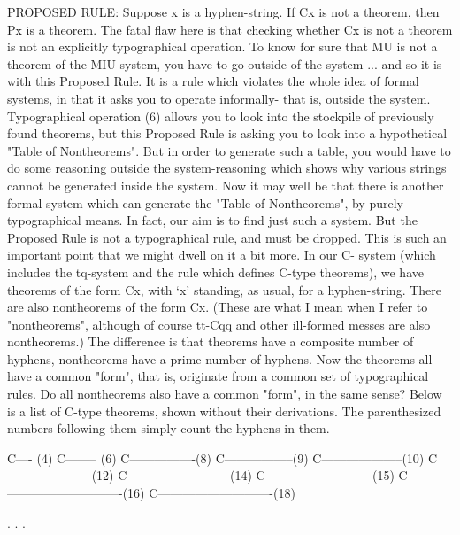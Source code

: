 PROPOSED RULE: Suppose x is a hyphen-string. If Cx is not a theorem, then Px is a
theorem.
The fatal flaw here is that checking whether Cx is not a theorem is not an explicitly
typographical operation. To know for sure that MU is not a theorem of the MIU-system,
you have to go outside of the system ... and so it is with this Proposed Rule. It is a rule
which violates the whole idea of formal systems, in that it asks you to operate informally-
that is, outside the system. Typographical operation (6) allows you to look into the
stockpile of previously found theorems, but this Proposed Rule is asking you to look into
a hypothetical "Table of Nontheorems". But in order to generate such a table, you would
have to do some reasoning outside the system-reasoning which shows why various strings
cannot be generated inside the system. Now it may well be that there is another formal
system which can generate the "Table of Nontheorems", by purely typographical means.
In fact, our aim is to find just such a system. But the Proposed Rule is not a typographical
rule, and must be dropped.
         This is such an important point that we might dwell on it a bit more. In our C-
system (which includes the tq-system and the rule which defines C-type theorems), we
have theorems of the form Cx, with `x' standing, as usual, for a hyphen-string. There are
also nontheorems of the form Cx. (These are what I mean when I refer to "nontheorems",
although of course tt-Cqq and other ill-formed messes are also nontheorems.) The
difference is that theorems have a composite number of hyphens, nontheorems have a
prime number of hyphens. Now the theorems all have a common "form", that is, originate
from a common set of typographical rules. Do all nontheorems also have a common
"form", in the same sense? Below is a list of C-type theorems, shown without their
derivations. The parenthesized numbers following them simply count the hyphens in
them.

                         C---- (4)
                         C-------- (6)
                         C----------------(8)
                         C-----------------(9)
                         C--------------------(10)
                         C -------------------- (12)
                         C------------------------ (14)
                         C ------------------------ (15)
                         C----------------------------(16)
                         C----------------------------(18)


                                           .
                                           .
                                           .

